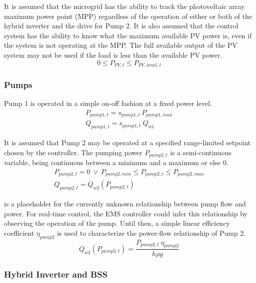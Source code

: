 It is assumed that the microgrid has the ability to track the photovoltaic array maximum power point (MPP) regardless of the operation of either or both of the hybrid inverter and the drive for Pump 2. It is also assumed that the control system has the ability to know what the maximum available PV power is, even if the system is not operating at the MPP. The full available output of the PV system may not be used if the load is less than the available PV power.
%
\begin{equation}
\label{eqn:pv-limit}
0 \le P_{PV,t} \le P_{PV,avail,t}
\end{equation}

\subsubsection{Pumps}

Pump 1 is operated in a simple on-off fashion at a fixed power level.
%
\begin{gather}
\label{eqn:pump1-power}
P_{pump1,t} = s_{pump1,t} \ P_{pump1,max} \\
\label{eqn:pump1-flow}
Q_{pump1,t} = s_{pump1,t} \ Q_{w1}
\end{gather}

It is assumed that Pump 2 may be operated at a specified range-limited setpoint chosen by the controller. The pumping power $P_{pump2,t}$ is a semi-continuous variable, being continuous between a minimum and a maximum or else 0.
%
\begin{gather}
\label{eqn:pump2-power}
P_{pump2,t} = 0 \ \lor \ P_{pump2,min} \le P_{pump2,t} \le P_{pump2,max} \\
\label{eqn:pump2-flow}
Q_{pump2,t} = Q_{w2}\left( P_{pump2,t} \right)
\end{gather}

 is a placeholder for the currently unknown relationship between pump flow and power. For real-time control, the EMS controller could infer this relationship by observing the operation of the pump. Until then, a simple linear efficiency coefficient $\eta_{pump2}$ is used to characterize the power-flow relationship of Pump 2.
%
\begin{equation}
\label{eqn:pump-flow-relation}
 Q_{w2}\left( P_{pump2,t} \right) = \frac{P_{pump2,t} \ \eta_{pump2}}{h \rho g}
\end{equation}

\subsubsection{Hybrid Inverter and BSS}

